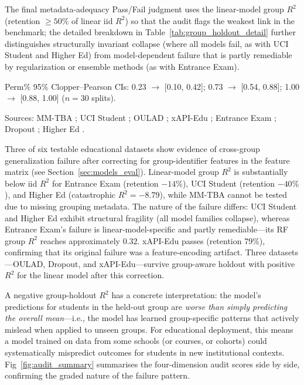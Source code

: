 \documentclass[10pt,letterpaper]{wlscirep}
\begin{document}
\begin{table}[htbp]
\begin{flushleft}
The final metadata-adequacy Pass/Fail judgment uses the linear-model group $R^2$ (retention $\geq 50\%$ of linear iid $R^2$) so that the audit flags the weakest link in the benchmark; the detailed breakdown in Table~\ref{tab:group_holdout_detail} further distinguishes structurally invariant collapse (where all models fail, as with UCI Student and Higher Ed) from model-dependent failure that is partly remediable by regularization or ensemble methods (as with Entrance Exam).\par
Perm\% 95\% Clopper--Pearson CIs: 0.23 $\to$ [0.10, 0.42]; 0.73 $\to$ [0.54, 0.88]; 1.00 $\to$ [0.88, 1.00] ($n=30$ splits).\par
Sources: MM-TBA \citep{Huang2025}; UCI Student \citep{Cortez2008}; OULAD \citep{Kuzilek2017}; xAPI-Edu \citep{Amrieh2016}; Entrance Exam \citep{Bora2021}; Dropout \citep{Realinho2022}; Higher Ed \citep{Yilmaz2020}.
\end{flushleft}
\end{table}

Three of six testable educational datasets show evidence of cross-group generalization failure after correcting for group-identifier features in the feature matrix (see Section~\ref{sec:models_eval}). Linear-model group $R^2$ is substantially below iid $R^2$ for Entrance Exam (retention $-14\%$), UCI Student (retention $-40\%$), and Higher Ed (catastrophic $R^2 = -8.79$), while MM-TBA cannot be tested due to missing grouping metadata. The nature of the failure differs: UCI Student and Higher Ed exhibit structural fragility (all model families collapse), whereas Entrance Exam's failure is linear-model-specific and partly remediable---its RF group $R^2$ reaches approximately $0.32$. xAPI-Edu passes (retention 79\%), confirming that its original failure was a feature-encoding artifact. Three datasets---OULAD, Dropout, and xAPI-Edu---survive group-aware holdout with positive $R^2$ for the linear model after this correction.

A negative group-holdout $R^2$ has a concrete interpretation: the model's predictions for students in the held-out group are \textit{worse than simply predicting the overall mean}---i.e., the model has learned group-specific patterns that actively mislead when applied to unseen groups. For educational deployment, this means a model trained on data from some schools (or courses, or cohorts) could systematically mispredict outcomes for students in new institutional contexts. Fig~\ref{fig:audit_summary} summarises the four-dimension audit scores side by side, confirming the graded nature of the failure pattern.
\end{document}
